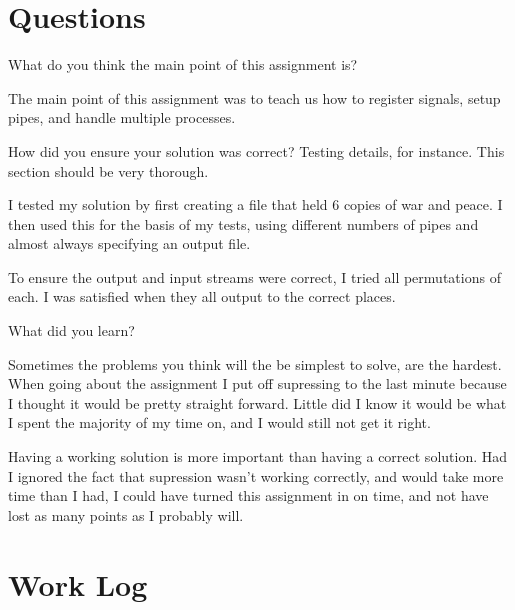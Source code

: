 \documentclass[letterpaper,10pt]{article}
\begin{document}
\section{Questions}
\begin{description}
  \item  What do you think the main point of this assignment is?

         The main point of this assignment was to teach us how to
         register signals, setup pipes, and handle multiple processes.

  \item  How did you ensure your solution was correct? Testing details, for
         instance. This section should be very thorough.

         I tested my solution by first creating a file that held 6
         copies of war and peace. I then used this for the basis of my
         tests, using different numbers of pipes and almost always
         specifying an output file.

         To ensure the output and input streams were correct, I tried
         all permutations of each. I was satisfied when they all output
         to the correct places.

  \item  What did you learn?

         Sometimes the problems you think will the be simplest to solve,
         are the hardest. When going about the assignment I put off
         supressing to the last minute because I thought it would be
         pretty straight forward. Little did I know it would be what I
         spent the majority of my time on, and I would still not get it
         right.

         Having a working solution is more important than having a
         correct solution. Had I ignored the fact that supression wasn't
         working correctly, and would take more time than I had, I could
         have turned this assignment in on time, and not have lost as
         many points as I probably will.
\end{description}

\newpage

\section{Work Log}


\end{document}
